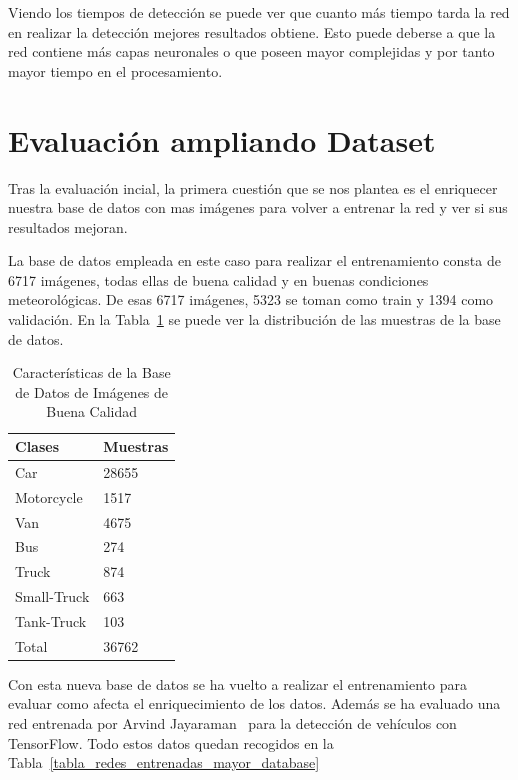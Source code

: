 Viendo los tiempos de detección se puede ver que cuanto más tiempo tarda la red en realizar la detección mejores resultados obtiene. Esto puede deberse a que la red contiene más capas neuronales o que poseen mayor complejidas y por tanto mayor tiempo en el procesamiento.


\section{Evaluación ampliando Dataset}\label{sec.ampliado_dataset}

Tras la evaluación incial, la primera cuestión que se nos plantea es el enriquecer nuestra base de datos con mas imágenes para volver a entrenar la red y ver si sus resultados mejoran. 

La base de datos empleada en este caso para realizar el entrenamiento consta de 6717 imágenes, todas ellas de buena calidad y en buenas condiciones meteorológicas. De esas 6717 imágenes, 5323 se toman como train y 1394 como validación. En la Tabla~\ref{tabla_redes_database_mayor} se puede ver la distribución de las muestras de la base de datos.

\begin{table}[htbp]
\begin{center}
\begin{tabular}{|l|l|}
\hline
Clases & Muestras \\
\hline \hline
Car & 28655 \\ \hline
Motorcycle & 1517 \\ \hline
Van & 4675 \\ \hline
Bus & 274 \\ \hline
Truck & 874 \\ \hline
Small-Truck & 663 \\ \hline
Tank-Truck & 103 \\ \hline
Total & 36762 \\ \hline
\end{tabular}
\caption{Características de la Base de Datos de Imágenes de Buena Calidad}
\label{tabla_redes_database_mayor}
\end{center}
\end{table}

Con esta nueva base de datos se ha vuelto a realizar el entrenamiento para evaluar como afecta el enriquecimiento de los datos. Además se ha evaluado una red entrenada por Arvind Jayaraman~\cite{CarND_VehicleDetection} para la detección de vehículos con TensorFlow. Todo estos datos quedan recogidos en la Tabla~\ref{tabla_redes_entrenadas_mayor_database}

